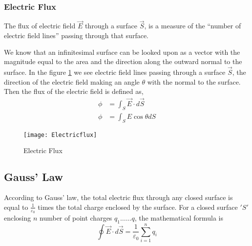 \subsubsection{Electric Flux}
\begin{definition}
The flux of electric field $ \vec{E} $ through a surface $\vec{S}  $, is a measure of the “number of electric field lines” passing through that surface.\end{definition}
We know that an infinitesimal surface  can be looked upon as a vector with the magnitude equal to the area and the direction along the outward normal to the surface. In the figure \ref{Electric flux} we see electric field lines passing through a surface $\vec{S}$, the direction of the electric
field making an angle $\theta$ with the normal to the surface. Then the flux of the electric field is defined as, 
\begin{align}
\phi&=\int_{S} \vec{E} \cdot d \vec{S} \\
\phi&=\int_{S} {E} \cos \theta d {S}
\end{align} 

\begin{figure}[H]
	\begin{center}
		\texttt{[image: Electricflux]}
	\end{center}
	\caption{Electric Flux}
	\label{Electric flux}
\end{figure}
\subsection{Gauss' Law}
\begin{definition}
	According to Gauss' law, the total electric flux through any closed surface is equal to $\frac{1}{\varepsilon_{0}}$ times the total charge enclosed by the surface.
	For a closed surface $ 'S' $ enclosing $n$ number of point charges $q_{1} \ldots \ldots q$, the mathematical formula is
	$$\oint \vec{E} \cdot d \vec{S}=\frac{1}{\varepsilon_{0}} \sum_{i=1}^{n} q_{i}$$
\end{definition}
